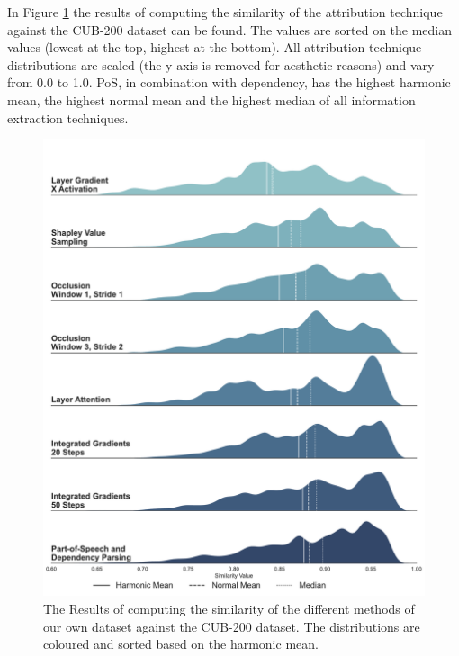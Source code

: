 \documentclass[a4paper, 12pt, oneside]{book} %
\begin{document}
In Figure \ref{fig:hmean_violin} the results of computing the similarity of the attribution technique against the CUB-200 dataset can be found.
The values are sorted on the median values (lowest at the top, highest at the bottom).
All attribution technique distributions are scaled (the y-axis is removed for aesthetic reasons) and vary from 0.0 to 1.0.
PoS, in combination with dependency, has the highest harmonic mean, the highest normal mean and the highest median of all information extraction techniques.
\begin{figure}[htpb]
 \centering
 \includegraphics[width=\textwidth]{figures/densities.pdf}
 \caption[Similarity results]{The Results of computing the similarity of the different methods of our own dataset against the CUB-200 dataset. The distributions are coloured and sorted based on the harmonic mean.}
 \label{fig:hmean_violin}
\end{figure}
\end{document}
